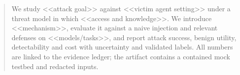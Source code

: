 \begin{abstract}
We study <<attack goal>> against <<victim agent setting>> under a threat model in which <<access and knowledge>>.
We introduce <<mechanism>>, evaluate it against a naive injection and relevant defenses on <<models/tasks>>,
and report attack success, benign utility, detectability and cost with uncertainty and validated labels.
All numbers are linked to the evidence ledger; the artifact contains a contained mock testbed and redacted
inputs.
\end{abstract}
